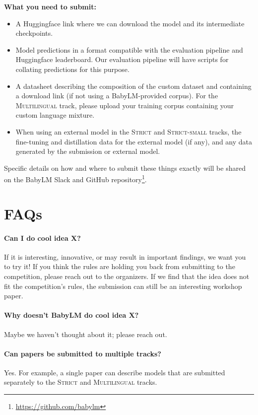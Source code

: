 \documentclass[11pt]{article}
\newcommand{\strict}[1]{\textsc{Strict}}
\newcommand{\strictsmall}[1]{\textsc{Strict-small}}
\newcommand{\multilingual}[1]{\textsc{Multilingual}}
\begin{document}
\vspace{0.2cm}
\noindent\textbf{What you need to submit:}
\begin{itemize}[leftmargin=0.5cm,rightmargin=0.5cm, itemsep=0cm]
    \item A Huggingface link where we can download the model and its intermediate checkpoints.
    \item Model predictions in a format compatible with the evaluation pipeline and Huggingface leaderboard. Our evaluation pipeline will have scripts for collating predictions for this purpose.
    \item A datasheet describing the composition of the custom dataset and containing a download link (if not using a BabyLM-provided corpus). For the \multilingual{} track, please upload your training corpus containing your custom language mixture.
    \item When using an external model in the \strict{} and \strictsmall{} tracks, the fine-tuning and distillation data for the external model (if any), and any data generated by the submission or external model.
\end{itemize}
Specific details on how and where to submit these things exactly will be shared on the BabyLM Slack and GitHub repository\footnote{\url{https://github.com/babylm}}.

\section{FAQs %
}
\paragraph{Can I do cool idea X?}
If it is interesting, innovative, or may result in important findings, we want you to try it! If you think the rules are holding you back from submitting to the competition, please reach out to the organizers. If we find that the idea does not fit the competition's rules, the submission can still be an interesting workshop paper.

\paragraph{Why doesn't BabyLM do cool idea X?}
Maybe we haven't thought about it; please reach out.

\paragraph{Can papers be submitted to multiple tracks?}
Yes. For example, a single paper can describe models that are submitted separately to the \strict{} and \multilingual{} tracks.
\end{document}
